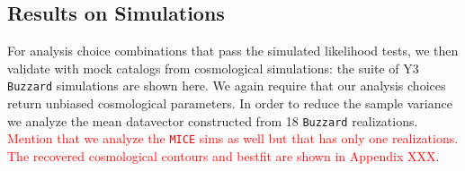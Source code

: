 \documentclass[fleqn,usenatbib]{mnras}
\newcommand{\gammat}{\ensuremath{\gamma_{t}(\theta)}}
\newcommand{\wtheta}{\ensuremath{w(\theta)}}
\newcommand{\lcdm}{$\Lambda$CDM}
\newcommand{\wcdm}{$w$CDM}
\newcommand{\mice}{\texttt{MICE} }
\newcommand{\buzzard}{\texttt{Buzzard} }
\newcommand{\red}[1]{\textcolor{red}{#1}}
\begin{document}




\subsection{Results on Simulations}

For  analysis choice combinations that pass the simulated likelihood tests, we then validate with mock catalogs from cosmological simulations: the suite of Y3 \buzzard simulations are shown here. We again require that our analysis choices  return unbiased cosmological parameters. In order to reduce the sample variance we analyze the mean datavector constructed from 18 \buzzard realizations. \red{Mention that we analyze the \mice sims as well but that has only one realizations. The recovered cosmological contours and bestfit are shown in Appendix XXX}.
\end{document}
